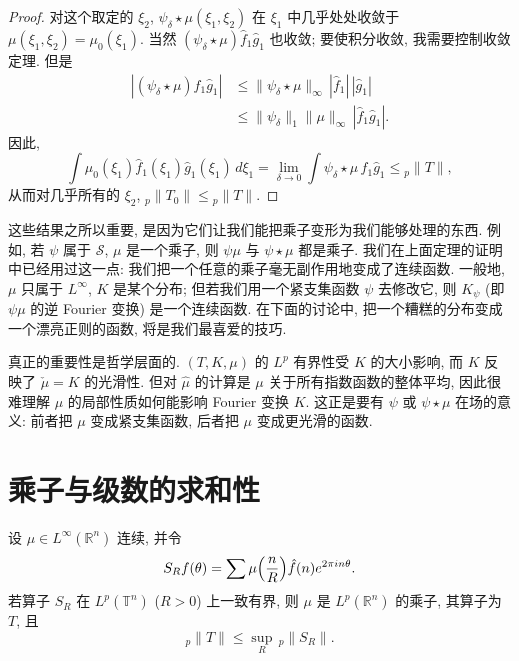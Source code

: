 \begin{proof}
对这个取定的 $\xi_2$, $\psi_{\delta}\star\mu(\xi_1,\xi_2)$ 在 $\xi_1$ 中几乎处处收敛于 $\mu(\xi_1,\xi_2)=\mu_0(\xi_1)$. 当然 $(\psi_{\delta}\star\mu)\hat{f}_1\hat{g}_1$ 也收敛; 要使积分收敛, 我需要控制收敛定理. 但是
\begin{align*}
|(\psi_{\delta}\star\mu)\hat{f}_1\hat{g}_1|&\leq\|\psi_{\delta}\star\mu\|_{\infty}\,|\hat{f}_1|\,|\hat{g}_1| \\
&\leq\|\psi_{\delta}\|_1\|\mu\|_{\infty}\,|\hat{f}_1\hat{g}_1|.
\end{align*}
因此,
\[
\int\mu_0(\xi_1)\hat{f}_1(\xi_1)\hat{g}_1(\xi_1)\,d\xi_1
=\lim_{\delta\to0}\int\psi_{\delta}\star\mu\,\hat{f}_1\hat{g}_1\leq{}_p\|T\|,
\]
从而对几乎所有的 $\xi_2$, ${}_p\|T_0\|\leq{}_p\|T\|$.
\end{proof}

\begin{remark}\label{rem:1.24}
这些结果之所以重要, 是因为它们让我们能把乘子变形为我们能够处理的东西. 例如, 若 $\psi$ 属于 $\mathcal{S}$, $\mu$ 是一个乘子, 则 $\psi\mu$ 与 $\psi\star\mu$ 都是乘子. 我们在上面定理的证明中已经用过这一点: 我们把一个任意的乘子毫无副作用地变成了连续函数. 一般地, $\mu$ 只属于 $L^{\infty}$, $K$ 是某个分布; 但若我们用一个紧支集函数 $\psi$ 去修改它, 则 $K_{\psi}$ (即 $\psi\mu$ 的逆 Fourier 变换) 是一个连续函数. 在下面的讨论中, 把一个糟糕的分布变成一个漂亮正则的函数, 将是我们最喜爱的技巧.

真正的重要性是哲学层面的. $(T,K,\mu)$ 的 $L^p$ 有界性受 $K$ 的大小影响, 而 $K$ 反映了 $\check{\mu}=K$ 的光滑性. 但对 $\hat{\mu}$ 的计算是 $\mu$ 关于所有指数函数的整体平均, 因此很难理解 $\mu$ 的局部性质如何能影响 Fourier 变换 $K$. 这正是要有 $\psi$ 或 $\psi\star\mu$ 在场的意义: 前者把 $\mu$ 变成紧支集函数, 后者把 $\mu$ 变成更光滑的函数.
\end{remark}

\section{乘子与级数的求和性}
\label{sec:1.3}

\begin{theorem}\label{thm:1.25}
设 $\mu\in L^{\infty}(\mathbb{R}^n)$ 连续, 并令
\[
S_Rf(\theta)=\sum\mu\Bigl(\frac{n}{R}\Bigr)\hat{f}(n)e^{2\pi in\theta}.
\]
若算子 $S_R$ 在 $L^p(\mathbb{T}^n)$ ($R>0$) 上一致有界, 则 $\mu$ 是 $L^p(\mathbb{R}^n)$ 的乘子, 其算子为 $T$, 且
\[
{}_p\|T\|\leq\sup_R\,{}_p\|S_R\|.
\]
\end{theorem}

